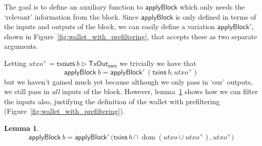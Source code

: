 \documentclass{article}
\newcommand{\restrictrange}{\rhd}
\DeclareMathOperator{\dom}{dom}
\newtheorem{lemma}{Lemma}[section] %
\numberwithin{equation}{lemma}
\begin{document}
The goal is to define an auxiliary function to $\mathsf{applyBlock}$ which only
needs the `relevant' information from the block. Since
$\mathsf{applyBlock}$ is only defined in terms of the inputs and outputs
of the block, we can easily define a variation $\mathsf{applyBlock}'$,
shown in Figure~\ref{fig:wallet_with_prefiltering}, that accepts these as two
separate arguments.

Letting
%
\begin{math}
\mathit{utxo}^+ = \mathsf{txouts} ~ b \restrictrange \mathsf{TxOut_{ours}}
\end{math}
%
we trivially we have that
%
\begin{equation*}
  \mathsf{applyBlock} ~ b
= \mathsf{applyBlock}' ~ (\mathsf{txins} ~ b, \mathit{utxo}^+)
\end{equation*}
%
but we haven't gained much yet because although we only pass in `our' outputs,
we still pass in \emph{all} inputs of the block.  However,
lemma~\ref{lem:prefiltering} shows how we can filter the inputs also, justifying
the definition of the wallet with prefiltering
(Figure~\ref{fig:wallet_with_prefiltering}).

\begin{lemma}
\begin{equation*}
  \mathsf{applyBlock} ~ b
= \mathsf{applyBlock}' ~ \Big( \mathsf{txins} ~ b \cap \dom (\mathit{utxo} \cup \mathit{utxo}^+), \mathit{utxo}^+ \Bigr)
\end{equation*}
\label{lem:prefiltering}
\end{lemma}
\end{document}
